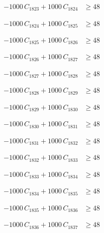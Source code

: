 \documentclass[a4paper,11pt]{article}
\begin{document}
\begin{align}
-1000\,C_{1823} + 1000\,C_{1824} &\geq 48 \nonumber
\end{align}

\begin{align}
-1000\,C_{1824} + 1000\,C_{1825} &\geq 48 \nonumber
\end{align}

\begin{align}
-1000\,C_{1825} + 1000\,C_{1826} &\geq 48 \nonumber
\end{align}

\begin{align}
-1000\,C_{1826} + 1000\,C_{1827} &\geq 48 \nonumber
\end{align}

\begin{align}
-1000\,C_{1827} + 1000\,C_{1828} &\geq 48 \nonumber
\end{align}

\begin{align}
-1000\,C_{1828} + 1000\,C_{1829} &\geq 48 \nonumber
\end{align}

\begin{align}
-1000\,C_{1829} + 1000\,C_{1830} &\geq 48 \nonumber
\end{align}

\begin{align}
-1000\,C_{1830} + 1000\,C_{1831} &\geq 48 \nonumber
\end{align}

\begin{align}
-1000\,C_{1831} + 1000\,C_{1832} &\geq 48 \nonumber
\end{align}

\begin{align}
-1000\,C_{1832} + 1000\,C_{1833} &\geq 48 \nonumber
\end{align}

\begin{align}
-1000\,C_{1833} + 1000\,C_{1834} &\geq 48 \nonumber
\end{align}

\begin{align}
-1000\,C_{1834} + 1000\,C_{1835} &\geq 48 \nonumber
\end{align}

\begin{align}
-1000\,C_{1835} + 1000\,C_{1836} &\geq 48 \nonumber
\end{align}

\begin{align}
-1000\,C_{1836} + 1000\,C_{1837} &\geq 48 \nonumber
\end{align}
\end{document}
